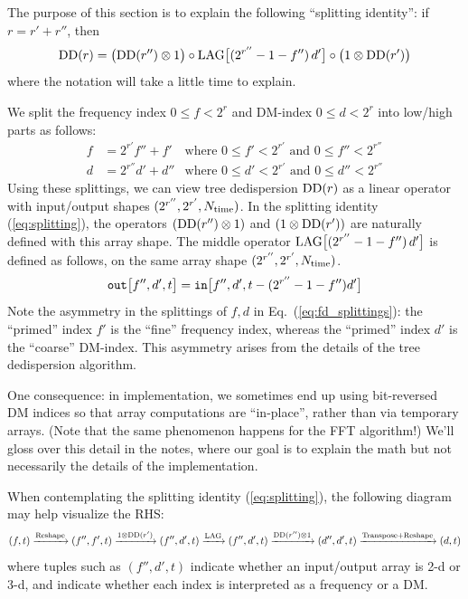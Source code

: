 \documentclass{article}
\numberwithin{equation}{section}   %
\def\DD{{\rm DD}}
\def\LAG{{\rm LAG}}
\def\nn{\nonumber}
\begin{document}
The purpose of this section is to explain the following ``splitting identity'':
if $r = r' + r''$, then
\begin{equation}
\DD(r) = \big( \DD(r'') \otimes 1 \big) \circ \LAG\big[ (2^{r''}-1-f'') \, d' \big] \circ \big( 1 \otimes \DD(r') \big)
  \label{eq:splitting}
\end{equation}
where the notation will take a little time to explain.

We split the frequency index $0 \le f < 2^r$ and DM-index $0 \le d < 2^r$ into low/high parts as follows:
\begin{align}
f &= 2^{r'} f'' + f' & \mbox{where } 0 \le f' < 2^{r'} \mbox{ and } 0 \le f'' < 2^{r''} \nn \\
d &= 2^{r''} d' + d'' & \mbox{where } 0 \le d' < 2^{r'} \mbox{ and } 0 \le d'' < 2^{r''} \label{eq:fd_splittings}
\end{align}
Using these splittings, we can view tree dedispersion $\DD(r)$ as a linear operator with
input/output shapes $(2^{r''}, 2^{r'}, N_{\rm time})$.
In the splitting identity (\ref{eq:splitting}), the operators $(\DD(r'') \otimes 1)$
and $(1 \otimes \DD(r'))$ are naturally defined with this array shape.
The middle operator $\LAG\big[ (2^{r''}-1-f'') \, d' \big]$ is defined as follows,
on the same array shape $(2^{r''}, 2^{r'}, N_{\rm time})$.
\begin{equation}
{\tt out}\big[ f'', d', t \big] = {\tt in}\big[f'', d', t - (2^{r''}-1-f'') d' \big]
\end{equation}
Note the asymmetry in the splittings of $f,d$ in Eq.\ (\ref{eq:fd_splittings}): the ``primed''
index $f'$ is the ``fine'' frequency index, whereas the ``primed'' index $d'$ is the ``coarse''
DM-index. This asymmetry arises from the details of the tree dedispersion algorithm. 

One consequence: in implementation, we sometimes end up using bit-reversed DM indices
so that array computations are ``in-place'', rather than via temporary arrays.
(Note that the same phenomenon happens for the FFT algorithm!)
We'll gloss over this detail in the notes, where our goal is to explain the math but
not necessarily the details of the implementation.

When contemplating the splitting identity (\ref{eq:splitting}), the following diagram
may help visualize the RHS:
\begin{equation}
(f,t) \xrightarrow{\rm Reshape} (f'',f',t)
 \xrightarrow{ 1 \otimes \DD(r')} (f'',d',t)
 \xrightarrow{\rm LAG} (f'',d',t)
 \xrightarrow{\DD(r'') \otimes 1} (d'',d',t)
 \xrightarrow{\rm Transpose + Reshape} (d,t)
\end{equation}
where tuples such as $(f'',d',t)$ indicate whether an input/output array is 2-d or 3-d,
and indicate whether each index is interpreted as a frequency or a DM.
\end{document}
